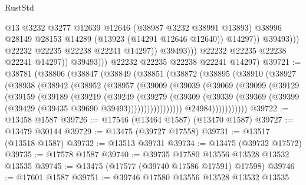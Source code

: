 \begin{lexlean}{RustStd}
\begin{coremodule}
                                    @13
                                    @3232
                                    @3277
                                    @12639
                                    @12646
                                    (@38987 @3232 @38991 @13893)
                                    @38996
                                    @28149
                                    @28153
                                    @14289
                                    (@13923 (@14291 @12646 @12640))
                                    @14297))
                                @39493)))
                          @22232
                          @22235
                          @22238
                          @22241
                          @14297))
                      @39493)))
                @22232
                @22235
                @22238
                @22241
                @14297))
            @39493)))
      @22232
      @22235
      @22238
      @22241
      @14297)
@39721 := @38781
    (@38806
      (@38847
        (@38849
          (@38851
            (@38872
              (@38895
                (@38910
                  (@38927
                    (@38938
                      (@38942
                        (@38952
                          (@38957
                            (@39009
                              (@39039
                                (@39069
                                  (@39099
                                    (@39129
                                      (@39159
                                        (@39189
                                          (@39219
                                            (@39249
                                              (@39279
                                                (@39309
                                                  (@39339
                                                    (@39369
                                                      (@39399
                                                        (@39429
                                                          (@39435 @39690 @39493)))))))))))))))))
                          @24984)))))))))))
@39722 := @13458 @1587
@39726 := @17546 (@13464 @1587) (@13470 @1587)
@39727 := @13479 @30144
@39729 := @13475 (@39727 @17558)
@39731 := @13517 (@13518 @1587)
@39732 := @13513 @39731
@39734 := @13475 (@39732 @17572)
@39735 := @17578 @1587
@39740 := @39735 @17580 @13556 @13528 @13532 @13535
@39745 := @13475 (@17577 (@39740 @17586 @17591) @17598)
@39746 := @17601 @1587
@39751 := @39746 @17580 @13556 @13528 @13532 @13535

\end{coremodule}
\end{lexlean}
